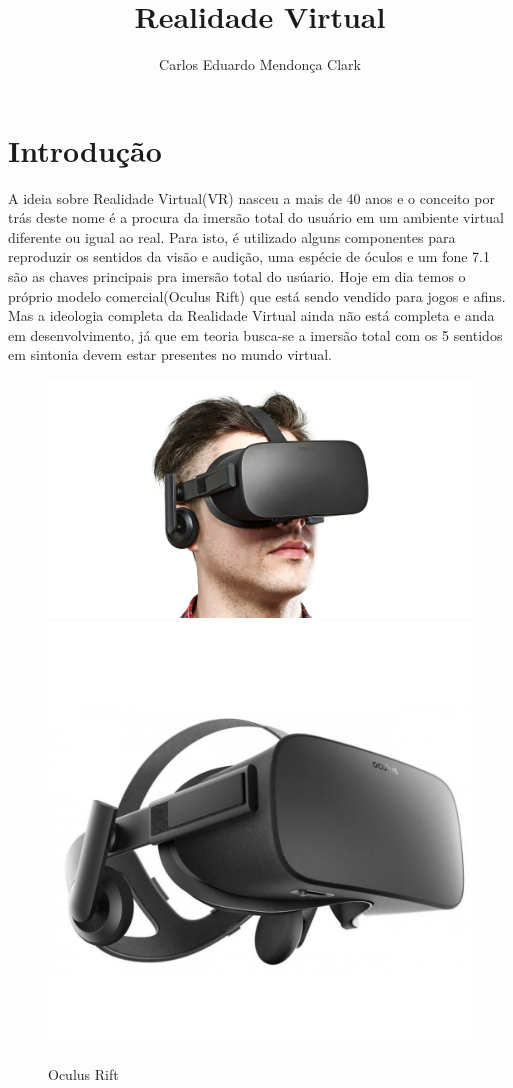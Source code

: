 \documentclass{paper}
\title{Realidade Virtual}
\author{Carlos Eduardo Mendonça Clark}
\begin{document}
\maketitle

\section{Introdução}
A ideia sobre Realidade Virtual(VR) nasceu a mais de 40 anos e o conceito por trás deste nome é a procura da imersão total do usuário em um ambiente virtual diferente ou igual ao real. Para isto, é utilizado alguns componentes para reproduzir os sentidos da visão e audição, uma espécie de óculos e um fone 7.1 são as chaves principais pra imersão total do usúario. Hoje em dia temos o próprio modelo comercial(Oculus Rift) que está sendo vendido para jogos e afins. Mas a ideologia completa da Realidade Virtual ainda não está completa e anda em desenvolvimento, já que em teoria busca-se a imersão total com os 5 sentidos em sintonia devem estar presentes no mundo virtual.
\begin{figure}[h!]
\centering
\includegraphics[scale=0.4]{Oculus.jpg}
\includegraphics[scale=0.08]{Oculus2.jpg}
\caption{Oculus Rift\citep{Oculus}}

\end{figure}
\end{document}
